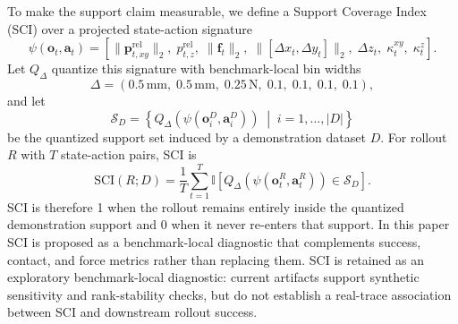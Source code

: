 ﻿\documentclass[11pt]{article}
\newcommand{\mm}{\ensuremath{\mathrm{mm}}}
\newcommand{\N}{\ensuremath{\mathrm{N}}}
\begin{document}
To make the support claim measurable, we define a Support Coverage Index (SCI) over a projected
state-action signature
\begin{equation}
\psi(\mathbf{o}_t,\mathbf{a}_t) =
\left[
\|\mathbf{p}^{\mathrm{rel}}_{t,xy}\|_2,\;
p^{\mathrm{rel}}_{t,z},\;
\|\mathbf{f}_t\|_2,\;
\|[\Delta x_t,\Delta y_t]\|_2,\;
\Delta z_t,\;
\kappa^{xy}_t,\;
\kappa^{z}_t
\right].
\end{equation}
Let $Q_{\Delta}$ quantize this signature with benchmark-local bin widths
\begin{equation}
\Delta =
\left(
0.5\,\mm,\;
0.5\,\mm,\;
0.25\,\N,\;
0.1,\;
0.1,\;
0.1,\;
0.1
\right),
\end{equation}
and let
\begin{equation}
\mathcal{S}_D =
\left\{
Q_{\Delta}\left(\psi(\mathbf{o}^{D}_i,\mathbf{a}^{D}_i)\right)
\;\middle|\;
i = 1,\dots, |D|
\right\}
\end{equation}
be the quantized support set induced by a demonstration dataset $D$. For rollout $R$ with $T$
state-action pairs, SCI is
\begin{equation}
\mathrm{SCI}(R;D) = \frac{1}{T}\sum_{t=1}^{T}
\mathbb{I}\left[
Q_{\Delta}\left(\psi(\mathbf{o}^{R}_t,\mathbf{a}^{R}_t)\right) \in \mathcal{S}_D
\right].
\end{equation}
SCI is therefore 1 when the rollout remains entirely inside the quantized demonstration support and
0 when it never re-enters that support. In this paper SCI is proposed as a benchmark-local
diagnostic that complements success, contact, and force metrics rather than replacing them. SCI is
retained as an exploratory benchmark-local diagnostic: current artifacts support synthetic
sensitivity and rank-stability checks, but do not establish a real-trace association between SCI
and downstream rollout success.
\end{document}
